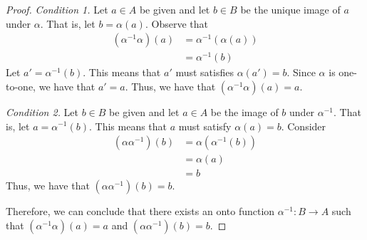 \begin{hwproblem}
\begin{proof}
    \textit{Condition 1.} Let \(a \in A\) be given and let \(b \in B\) be the unique image of \(a\) under \(\alpha\). That is, let \(b = \alpha(a)\). Observe that
    \[
    \begin{aligned}
        (\alpha^{-1}\alpha)(a) &= \alpha^{-1}(\alpha(a)) \\
                               &= \alpha^{-1}(b)
    \end{aligned}
    \]
    Let \(a' = \alpha^{-1}(b)\). This means that \(a'\) must satisfies \(\alpha(a') = b\). Since \(\alpha\) is one-to-one, we have that \(a' = a\). Thus, we have that \( (\alpha^{-1}\alpha)(a) = a \).

    \textit{Condition 2.} Let \(b \in B\) be given and let \(a \in A\) be the image of \(b\) under \(\alpha^{-1}\). That is, let \(a = \alpha^{-1}(b)\). This means that \(a\) must satisfy \(\alpha(a) = b\). Consider
    \[
    \begin{aligned}
        (\alpha\alpha^{-1})(b) &= \alpha(\alpha^{-1}(b)) \\
                               &= \alpha(a) \\
                               &= b
    \end{aligned}
    \]
    Thus, we have that \( (\alpha\alpha^{-1})(b) = b \).

    Therefore, we can conclude that there exists an onto function \(\alpha^{-1}: B \to A\) such that \((\alpha^{-1}\alpha)(a) = a\) and \((\alpha\alpha^{-1})(b) = b\).
\end{proof}
\end{hwproblem}
